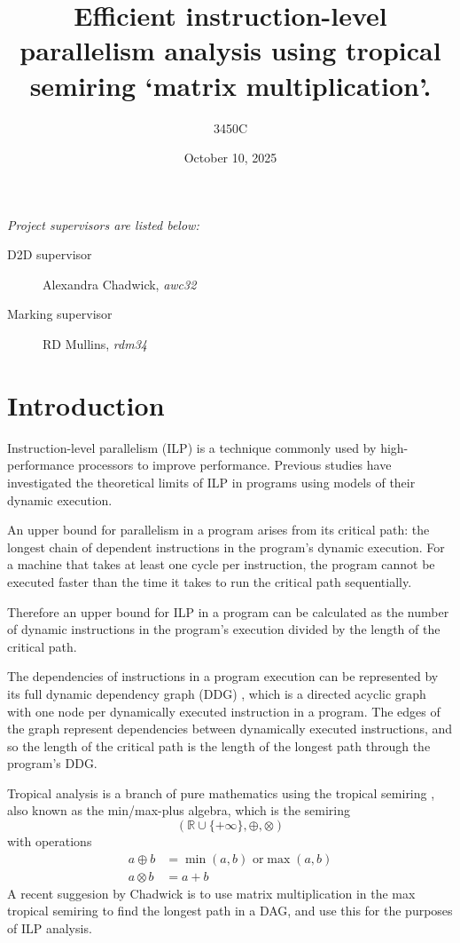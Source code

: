 \documentclass[a4paper,12pt]{article}
\title{Efficient instruction-level parallelism analysis using tropical semiring \lq{matrix multiplication\rq}.}
\author{3450C}
\date{October 10, 2025}
\begin{document}
\maketitle

{\footnotesize
\noindent \textit{Project supervisors are listed below:}
\begin{description}
  \item[D2D supervisor] Alexandra Chadwick, \textit{awc32}
  \item[Marking supervisor] RD Mullins, \textit{rdm34}
\end{description}
}

\section{Introduction}


Instruction-level parallelism (ILP) is a technique commonly
used by high-performance processors to improve performance.
Previous studies \cite{11096386} have investigated the theoretical
limits of ILP in programs using models of their dynamic execution.


An upper bound for parallelism in a program arises from its critical
path: the longest chain of dependent instructions in the program's
dynamic execution. For a machine that takes at least one cycle per
instruction, the program cannot be executed faster than the time it takes
to run the critical path sequentially.

Therefore an upper bound for ILP in a program can be calculated as the
number of dynamic instructions in the program's execution divided by the
length of the critical path.


The dependencies of instructions in a program execution can be represented
by its full dynamic dependency graph (DDG) \cite{753330}, which is a directed
acyclic graph with one node per dynamically executed instruction in a program.
The edges of the graph represent dependencies between dynamically executed instructions,
and so the length of the critical path is the length of the longest path through
the program's DDG.


Tropical analysis is a branch of pure mathematics using the tropical semiring \cite{pin:hal-00113779},
also known as the min/max-plus algebra, which is the semiring
\[(\mathbb{R} \cup \{+\infty\}, \oplus, \otimes)\]
with operations
\[
\begin{aligned}
  a \oplus b & = \min(a, b) \text{ or} \max(a, b) \\
  a \otimes b & = a + b
\end{aligned}
\]
A recent suggesion by Chadwick \cite{Chadderz} is to use matrix multiplication in the max
tropical semiring to find the longest path in a DAG, and use this for the purposes of
ILP analysis.
\end{document}
